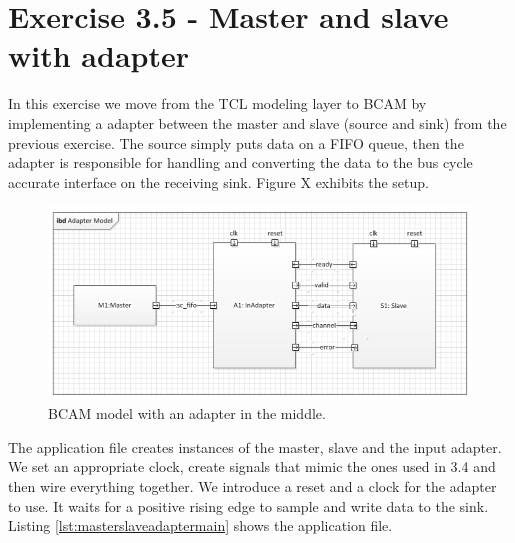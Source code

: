 \section{Exercise 3.5 - Master and slave with adapter}

In this exercise we move from the TCL modeling layer to BCAM by implementing a adapter between the master and slave (source and sink) from the previous exercise. The source simply puts data on a FIFO queue, then the adapter is responsible for handling and converting the data to the bus cycle accurate interface on the receiving sink. Figure X exhibits the setup.

\begin{figure}[h]
	\centering
	\includegraphics[width=1\linewidth]{MasterSlaveAdapter.png}
	\caption{BCAM model with an adapter in the middle.}
	\label{fig:masterslaveadapter}
\end{figure}

The application file creates instances of the master, slave and the input adapter. We set an appropriate clock, create signals that mimic the ones used in 3.4 and then wire everything together. We introduce a reset and a clock for the adapter to use. It waits for a positive rising edge to sample and write data to the sink. Listing \ref{lst:masterslaveadaptermain} shows the application file.


